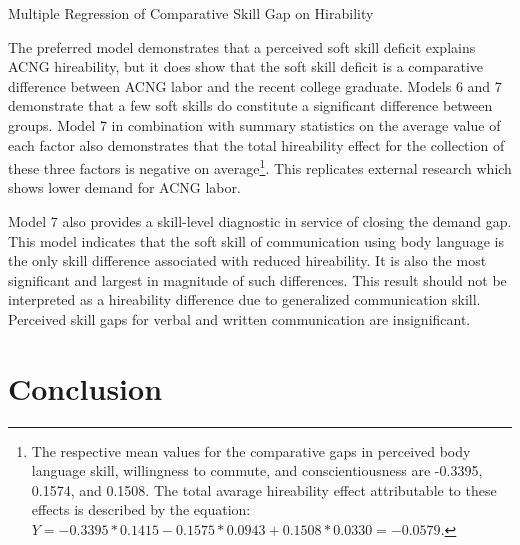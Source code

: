 \documentclass[review]{elsarticle}
\begin{document}
\begin{table}
    \caption{Multiple Regression of Comparative Skill Gap on Hirability}
    \resizebox{\columnwidth}{!}{
        
    }
    \label{tab:gap_of_gaps}
\end{table}

The preferred model demonstrates that a perceived soft skill deficit explains ACNG hireability,
but it does show that the soft skill deficit is a comparative difference between ACNG labor and the recent college graduate.
Models 6 and 7 demonstrate that a few soft skills do constitute a significant difference between groups.
Model 7 in combination with summary statistics on the average value of each factor also demonstrates that
the total hireability effect for the collection of these three factors is negative on average\footnote{
    The respective mean values for the comparative gaps in perceived body language skill,
    willingness to commute,
    and conscientiousness
    are -0.3395, 0.1574, and 0.1508.
    The total avarage hireability effect attributable to these effects is described by the equation:
    $Y = -0.3395*0.1415 - 0.1575*0.0943 + 0.1508*0.0330 = -0.0579$.
}.
This replicates external research which shows lower demand for ACNG labor.

Model 7 also provides a skill-level diagnostic in service of closing the demand gap.
This model indicates that the soft skill of communication using body language is the only skill difference associated with reduced hireability.
It is also the most significant and largest in magnitude of such differences.
This result should not be interpreted as a hireability difference due to generalized communication skill.
Perceived skill gaps for verbal and written communication are insignificant.


\section{Conclusion}
\end{document}
